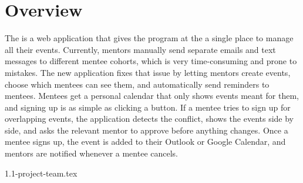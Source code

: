 \section{Overview}

The {\ClientName} {\ClientProject} is a web application that gives the
{\ClientName} program at the {\ClientOrganization} a single place to manage all
their events. Currently, mentors manually send separate emails and text messages
to different mentee cohorts, which is very time-consuming and prone to mistakes.
The new application fixes that issue by letting mentors create events, choose
which mentees can see them, and automatically send reminders to mentees. Mentees
get a personal calendar that only shows events meant for them, and signing up is
as simple as clicking a button. If a mentee tries to sign up for overlapping
events, the application detects the conflict, shows the events side by side, and
asks the relevant mentor to approve before anything changes. Once a mentee signs
up, the event is added to their Outlook or Google Calendar, and mentors are
notified whenever a mentee cancels.

{1.1-project-team.tex}
